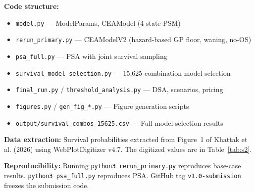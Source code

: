 \documentclass[11pt,a4paper]{article}
\begin{document}
\textbf{Code structure:}
\begin{itemize}
    \item \texttt{model.py} --- ModelParams, CEAModel (4-state PSM)
    \item \texttt{rerun\_primary.py} --- CEAModelV2 (hazard-based GP floor, waning, no-OS)
    \item \texttt{psa\_full.py} --- PSA with joint survival sampling
    \item \texttt{survival\_model\_selection.py} --- 15,625-combination model selection
    \item \texttt{final\_run.py} / \texttt{threshold\_analysis.py} --- DSA, scenarios, pricing
    \item \texttt{figures.py} / \texttt{gen\_fig\_*.py} --- Figure generation scripts
    \item \texttt{output/survival\_combos\_15625.csv} --- Full model selection results
\end{itemize}

\textbf{Data extraction:} Survival probabilities extracted from Figure~1 of Khattak et al. (2026) using WebPlotDigitizer v4.7. The digitized values are in Table~\ref{tab:s2}.

\textbf{Reproducibility:} Running \texttt{python3 rerun\_primary.py} reproduces base-case results. \texttt{python3 psa\_full.py} reproduces PSA. GitHub tag \texttt{v1.0-submission} freezes the submission code.
\end{document}
